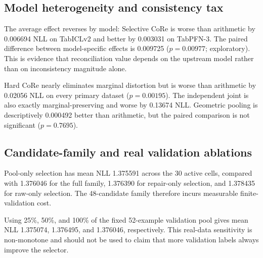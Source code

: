 \documentclass[twoside,11pt]{article}
\begin{document}
\subsection{Model heterogeneity and consistency tax}
The average effect reverses by model: Selective CoRe is worse than arithmetic by 0.006694 NLL on TabICLv2 and better by 0.003031 on TabPFN-3. The paired difference between model-specific effects is 0.009725 ($p=0.00977$; exploratory). This is evidence that reconciliation value depends on the upstream model rather than on inconsistency magnitude alone.

Hard CoRe nearly eliminates marginal distortion but is worse than arithmetic by 0.02056 NLL on every primary dataset ($p=0.00195$). The independent joint is also exactly marginal-preserving and worse by 0.13674 NLL. Geometric pooling is descriptively 0.000492 better than arithmetic, but the paired comparison is not significant ($p=0.7695$).

\subsection{Candidate-family and real validation ablations}
Pool-only selection has mean NLL 1.375591 across the 30 active cells, compared with 1.376046 for the full family, 1.376390 for repair-only selection, and 1.378435 for raw-only selection. The 48-candidate family therefore incurs measurable finite-validation cost.

Using 25\%, 50\%, and 100\% of the fixed 52-example validation pool gives mean NLL 1.375074, 1.376495, and 1.376046, respectively. This real-data sensitivity is non-monotone and should not be used to claim that more validation labels always improve the selector.
\end{document}
